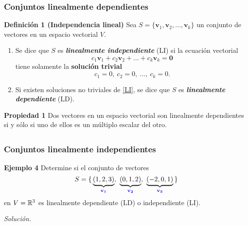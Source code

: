 {\nologo
\begin{frame}\frametitle{Conjuntos linealmente dependientes}

\begin{block}{\textbf{Definición 1 (Independencia lineal)}}
	\justifying
	Sea $S=\{\mathbf{v}_1,\mathbf{v}_2,\hdots,\mathbf{v}_k\}$ un conjunto de vectores
	en un espacio vectorial $V$.
	
	\begin{enumerate}%
		\item[\labelname{$a$}] Se dice que $S$ es \textbf{\textit{linealmente independiente}} (LI) si
		la ecuación vectorial
		\begin{equation}\tag{1}
		c_1\mathbf{v}_1+c_2\mathbf{v}_2+\hdots+c_k\mathbf{v}_k = \mathbf{0}
		\end{equation}
		tiene solamente la \textbf{solución trivial}
		\[
		c_1 =0,\ c_2 =0,\ \hdots,\ c_k=0.
		\]
		
		\item[\labelname{$b$}] Si existen soluciones no triviales de \eqref{LI}, se dice que $S$ es \textbf{\textit{linealmente dependiente}} (LD).
	\end{enumerate}		
\end{block}

\begin{prop}{\textbf{Propiedad 1}}
	Dos vectores en un espacio vectorial son linealmente dependientes si y sólo si uno de ellos es un múltiplo escalar del otro.
\end{prop}

\end{frame}
}


\subsection{}

\begin{frame}\frametitle{Conjuntos linealmente independientes}

\begin{ej}{\textbf{Ejemplo 4}} \justifying
Determine si el conjunto de vectores
\[
S = \{ \, \underbrace{(1,2,3)}_{\color{blue}\mathbf{v_1}}, \ \underbrace{(0,1,2)}_{\color{blue}\mathbf{v_2}}, \ 
\underbrace{(-2,0,1)}_{\color{blue}\mathbf{v_3}} \, \}
\]
en $V=\mathbb{R}^3$ es linealmente dependiente (LD) o independiente (LI).
\end{ej}	
\textit{Solución.}

\end{frame}

